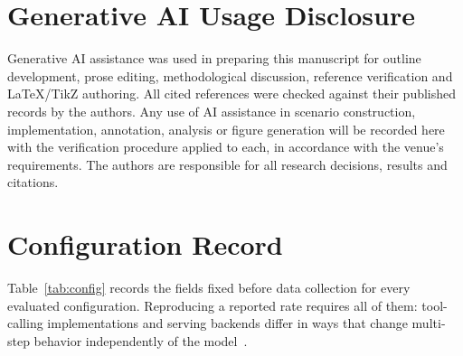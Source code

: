 \documentclass[sigconf,review,anonymous]{acmart}
\begin{document}

\section*{Generative AI Usage Disclosure}

Generative AI assistance was used in preparing this manuscript
for outline development, prose editing, methodological
discussion, reference verification and LaTeX/TikZ authoring.
All cited references were checked against their published
records by the authors. Any use of AI assistance in scenario
construction, implementation, annotation, analysis or figure
generation will be recorded here with the verification
procedure applied to each, in accordance with the venue's
requirements. The authors are responsible for all research
decisions, results and citations.


\appendix

\section{Configuration Record}
\label{app:config}


Table~\ref{tab:config} records the fields fixed before data
collection for every evaluated configuration. Reproducing a
reported rate requires all of them: tool-calling
implementations and serving backends differ in ways that change
multi-step behavior independently of the
model~\cite{chen2026tracesafe}.
\end{document}

